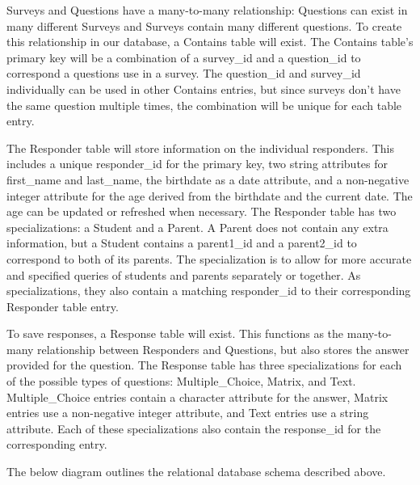 Surveys and Questions have a many-to-many relationship: Questions can exist in many different Surveys and Surveys contain many different questions.
To create this relationship in our database, a Contains table will exist.
The Contains table's primary key will be a combination of a survey\_id and a question\_id to correspond a questions use in a survey.
The question\_id and survey\_id individually can be used in other Contains entries, but since surveys don't have the same question multiple times, the combination will be unique for each table entry.

The Responder table will store information on the individual responders.
This includes a unique responder\_id for the primary key, two string attributes for first\_name and last\_name, the birthdate as a date attribute, and a non-negative integer attribute for the age derived from the birthdate and the current date.
The age can be updated or refreshed when necessary.
The Responder table has two specializations: a Student and a Parent.
A Parent does not contain any extra information, but a Student contains a parent1\_id and a parent2\_id to correspond to both of its parents.
The specialization is to allow for more accurate and specified queries of students and parents separately or together.
As specializations, they also contain a matching responder\_id to their corresponding Responder table entry.

To save responses, a Response table will exist.
This functions as the many-to-many relationship between Responders and Questions, but also stores the answer provided for the question.
The Response table has three specializations for each of the possible types of questions: Multiple\_Choice, Matrix, and Text.
Multiple\_Choice entries contain a character attribute for the answer, Matrix entries use a non-negative integer attribute, and Text entries use a string attribute.
Each of these specializations also contain the response\_id for the corresponding entry.

The below diagram outlines the relational database schema described above.

